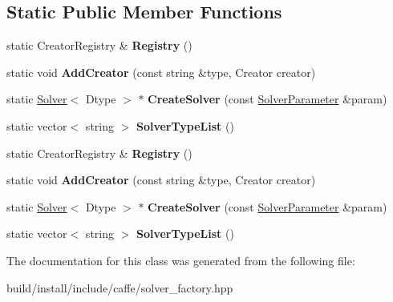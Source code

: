 \subsection*{Static Public Member Functions}
\begin{DoxyCompactItemize}
\item 
\mbox{\label{classcaffe_1_1_solver_registry_a0dedbd11887e772fcf71a619e054e756}} 
static Creator\+Registry \& {\bfseries Registry} ()
\item 
\mbox{\label{classcaffe_1_1_solver_registry_a0426cb96095767aa03edd8adb8d97d03}} 
static void {\bfseries Add\+Creator} (const string \&type, Creator creator)
\item 
\mbox{\label{classcaffe_1_1_solver_registry_aa44d7f6b9efbd266c939665040e84621}} 
static \mbox{\hyperlink{classcaffe_1_1_solver}{Solver}}$<$ Dtype $>$ $\ast$ {\bfseries Create\+Solver} (const \mbox{\hyperlink{classcaffe_1_1_solver_parameter}{Solver\+Parameter}} \&param)
\item 
\mbox{\label{classcaffe_1_1_solver_registry_acfb421d7893f5322a42c04b3dd4b559e}} 
static vector$<$ string $>$ {\bfseries Solver\+Type\+List} ()
\item 
\mbox{\label{classcaffe_1_1_solver_registry_a0dedbd11887e772fcf71a619e054e756}} 
static Creator\+Registry \& {\bfseries Registry} ()
\item 
\mbox{\label{classcaffe_1_1_solver_registry_a0426cb96095767aa03edd8adb8d97d03}} 
static void {\bfseries Add\+Creator} (const string \&type, Creator creator)
\item 
\mbox{\label{classcaffe_1_1_solver_registry_aa44d7f6b9efbd266c939665040e84621}} 
static \mbox{\hyperlink{classcaffe_1_1_solver}{Solver}}$<$ Dtype $>$ $\ast$ {\bfseries Create\+Solver} (const \mbox{\hyperlink{classcaffe_1_1_solver_parameter}{Solver\+Parameter}} \&param)
\item 
\mbox{\label{classcaffe_1_1_solver_registry_acfb421d7893f5322a42c04b3dd4b559e}} 
static vector$<$ string $>$ {\bfseries Solver\+Type\+List} ()
\end{DoxyCompactItemize}


The documentation for this class was generated from the following file\+:\begin{DoxyCompactItemize}
\item 
build/install/include/caffe/solver\+\_\+factory.\+hpp\end{DoxyCompactItemize}
